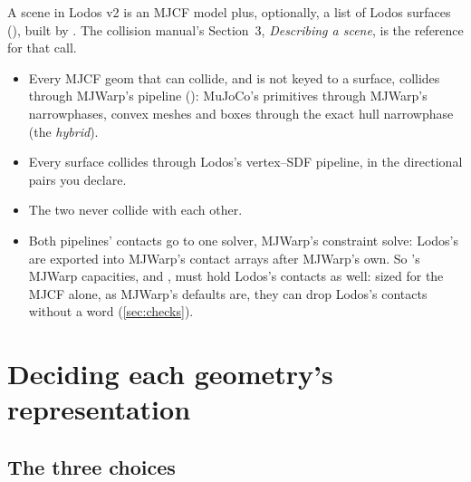 A scene in Lodos v2 is an MJCF model plus, optionally, a list of Lodos surfaces (), built by . The collision manual's Section~3, \emph{Describing a scene}, is the reference for that call.

\begin{itemize}
\item Every MJCF geom that can collide, and is not keyed to a surface, collides through MJWarp's pipeline (): MuJoCo's primitives through MJWarp's narrowphases, convex meshes and boxes through the exact hull narrowphase (the \emph{hybrid}).
\item Every surface collides through Lodos's vertex--SDF pipeline, in the directional pairs you declare.
\item The two never collide with each other.
\item Both pipelines' contacts go to one solver, MJWarp's constraint solve: Lodos's are exported into MJWarp's contact arrays after MJWarp's own. So 's MJWarp capacities,  and , must hold Lodos's contacts as well: sized for the MJCF alone, as MJWarp's defaults are, they can drop Lodos's contacts without a word (\cref{sec:checks}).
\end{itemize}

\section{Deciding each geometry's representation}\label{sec:decide}

\subsection{The three choices}\label{sec:choices}

